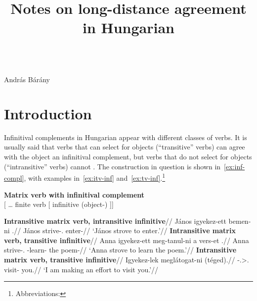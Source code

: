 



\usepackage{xurl}


\title{Notes on long-distance agreement in Hungarian}




\thispagestyle{plain}
\\[.2cm]
\noindent\textsf{András Bárány}

\section{Introduction}\label{sec:introduction}

Infinitival complements in Hungarian appear with different classes of verbs. It
is usually said that verbs that can select for \Acc{} objects
(\enquote{transitive} verbs) can agree with the object an infinitival
complement, but verbs that do not select for \Acc{} objects
(\enquote{intransitive} verbs) cannot
\parencite{EKiss1987,EKiss1989,KalmanCetal1989,KenVagFeny1998,EKiss2002,EKissvanRie2004b,denDikken2004,Coppock2012d,Szecsenyi2017,SzeSze2018}.
%
The construction in question is shown in~\eqref{ex:inf-compl}, with examples
in~\eqref{ex:itv-inf} and~\eqref{ex:tv-inf}.\footnote{Abbreviations:
\printglosses}

\ex\label{ex:inf-compl}\textbf{Matrix verb with infinitival complement}\\
    {}[ \dots{} finite verb [\tss{\Inf} infinitive (object-\Acc{}) ]]
\xe

\pex\label{ex:itv-inf}
    \a
    \begingl
        \glpreamble \textbf{Intransitive matrix verb, intransitive infinitive}//
        \gla 	János igyekez-ett \nogloss{[\tss{\Inf}} bemen-ni \nogloss{]}.//
        \glb 	János strive-\Tsg.\Pst{} enter-\Inf{}//
        \glft 	\enquote*{János strove to enter.}//
    \endgl
    \a
    \begingl
        \glpreamble \textbf{Intransitive matrix verb, transitive infinitive}//
        \gla 	Anna igyekez-ett \nogloss{[\tss{\Inf}} meg-tanul-ni a vers-et \nogloss{]}.//
        \glb 	Anna strive-\Tsg.\Pst{} \Vm-learn-\Inf{} the poem-\Acc{}//
        \glft 	\enquote*{Anna strove to learn the poem.}//
    \endgl
    \a
    \begingl
        \glpreamble \textbf{Intransitive matrix verb, transitive infinitive}//
        \gla 	Igyekez-lek meglátogat-ni (téged).//
        -\Fsg.\Sbj>\Second.\Obj{} visit-\Inf{} you.\Acc{}//
        \glft 	\enquote*{I am making an effort to visit you.}//
    \endgl
\xe

